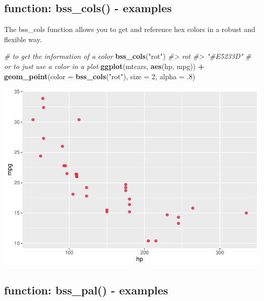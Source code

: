 \documentclass[
]{article}
\newenvironment{Shaded}{\begin{snugshade}}{\end{snugshade}}
\newcommand{\CommentTok}[1]{\textcolor[rgb]{0.56,0.35,0.01}{\textit{#1}}}
\newcommand{\DataTypeTok}[1]{\textcolor[rgb]{0.13,0.29,0.53}{#1}}
\newcommand{\DecValTok}[1]{\textcolor[rgb]{0.00,0.00,0.81}{#1}}
\newcommand{\FloatTok}[1]{\textcolor[rgb]{0.00,0.00,0.81}{#1}}
\newcommand{\KeywordTok}[1]{\textcolor[rgb]{0.13,0.29,0.53}{\textbf{#1}}}
\newcommand{\NormalTok}[1]{#1}
\newcommand{\OperatorTok}[1]{\textcolor[rgb]{0.81,0.36,0.00}{\textbf{#1}}}
\newcommand{\StringTok}[1]{\textcolor[rgb]{0.31,0.60,0.02}{#1}}
\begin{document}
\hypertarget{function-bss_cols---examples}{%
\subsection{function: bss\_cols() -
examples}\label{function-bss_cols---examples}}

The bss\_cols function allows you to get and reference hex colors in a
robust and flexible way.

\begin{Shaded}
\begin{Highlighting}[]
\CommentTok{\# to get the information of a color}
\KeywordTok{bss\_cols}\NormalTok{(}\StringTok{"rot"}\NormalTok{)}
\CommentTok{\#\textgreater{}       rot }
\CommentTok{\#\textgreater{} "\#E5233D"}
\CommentTok{\# or to just use a color in a plot}
\KeywordTok{ggplot}\NormalTok{(mtcars, }\KeywordTok{aes}\NormalTok{(hp, mpg)) }\OperatorTok{+}
\StringTok{  }\KeywordTok{geom\_point}\NormalTok{(}\DataTypeTok{color =} \KeywordTok{bss\_cols}\NormalTok{(}\StringTok{"rot"}\NormalTok{),}
             \DataTypeTok{size =} \DecValTok{2}\NormalTok{, }\DataTypeTok{alpha =} \FloatTok{.8}\NormalTok{)}
\end{Highlighting}
\end{Shaded}

\includegraphics[width=1\linewidth]{man/figures/README-bss_cols-1}

\hypertarget{function-bss_pal---examples}{%
\subsection{function: bss\_pal() -
examples}\label{function-bss_pal---examples}}
\end{document}
